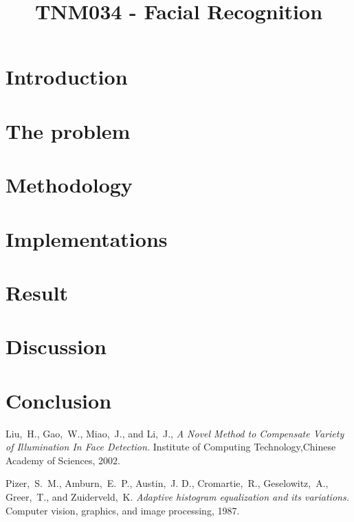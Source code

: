 \documentclass[conference]{IEEEtran}
\begin{document}
\title{TNM034 - Facial Recognition}

\author{
\and
{}
\and
{}
}

\maketitle

\begin{abstract}

\end{abstract}

\section{Introduction}


\section{The problem}


\section{Methodology}


\section{Implementations}


\section{Result}


\section{Discussion}


\section{Conclusion}


\begin{thebibliography}{1}

Liu,~H., Gao,~W., Miao,~J., and Li,~J., \emph{A Novel Method to Compensate Variety of Illumination In Face Detection.} Institute of Computing Technology,Chinese Academy of Sciences, 2002.

Pizer,~S.~M., Amburn,~E.~P., Austin,~J. D., Cromartie,~R., Geselowitz,~A., Greer,~T., and Zuiderveld,~K. \emph{Adaptive histogram equalization and its variations.} Computer vision, graphics, and image processing, 1987.

\end{thebibliography}




\end{document}
